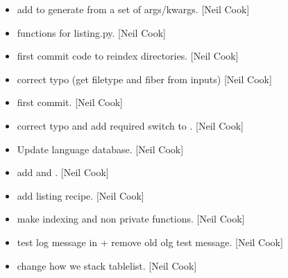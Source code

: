 \documentclass[a4paper,10pt,english]{report}
\begin{document}
\label{\detokenize{misc/changelog:id91}}\begin{itemize}
\item {} 
 \sphinxhyphen{} add  to
generate  from a set of args/kwargs. {[}Neil Cook{]}

\item {} 
 \sphinxhyphen{} functions for listing.py. {[}Neil
Cook{]}

\item {} 
 \sphinxhyphen{} first commit \sphinxhyphen{} code to re\sphinxhyphen{}index directories.
{[}Neil Cook{]}

\item {} 
 \sphinxhyphen{} correct typo (get filetype
and fiber from inputs) {[}Neil Cook{]}

\item {} 
 \sphinxhyphen{} first commit. {[}Neil Cook{]}

\item {} 
 \sphinxhyphen{} correct typo and add required switch to
. {[}Neil Cook{]}

\item {} 
Update language database. {[}Neil Cook{]}

\item {} 
 \sphinxhyphen{} add  and
. {[}Neil Cook{]}

\item {} 
 \sphinxhyphen{} add listing recipe.
{[}Neil Cook{]}

\item {} 
 \sphinxhyphen{} make indexing and  non
private functions. {[}Neil Cook{]}

\item {} 
 \sphinxhyphen{} test log message in  + remove
old olg test message. {[}Neil Cook{]}

\item {} 
 \sphinxhyphen{} change how we stack tablelist. {[}Neil Cook{]}


\end{itemize}
\end{document}
